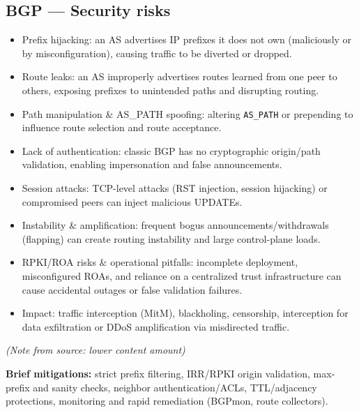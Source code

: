 \documentclass[12pt]{article}
\begin{document}
\subsection{BGP --- Security risks}
\begin{itemize}
  \item Prefix hijacking: an AS advertises IP prefixes it does not own (maliciously or by misconfiguration), causing traffic to be diverted or dropped.
  \item Route leaks: an AS improperly advertises routes learned from one peer to others, exposing prefixes to unintended paths and disrupting routing.
  \item Path manipulation \& AS\_PATH spoofing: altering \texttt{AS\_PATH} or prepending to influence route selection and route acceptance.
  \item Lack of authentication: classic BGP has no cryptographic origin/path validation, enabling impersonation and false announcements.
  \item Session attacks: TCP-level attacks (RST injection, session hijacking) or compromised peers can inject malicious UPDATEs.
  \item Instability \& amplification: frequent bogus announcements/withdrawals (flapping) can create routing instability and large control-plane loads.
  \item RPKI/ROA risks \& operational pitfalls: incomplete deployment, misconfigured ROAs, and reliance on a centralized trust infrastructure can cause accidental outages or false validation failures.
  \item Impact: traffic interception (MitM), blackholing, censorship, interception for data exfiltration or DDoS amplification via misdirected traffic.
\end{itemize}

\textit{(Note from source: lower content amount)}

\textbf{Brief mitigations:} strict prefix filtering, IRR/RPKI origin validation, max-prefix and sanity checks, neighbor authentication/ACLs, TTL/adjacency protections, monitoring and rapid remediation (BGPmon, route collectors).

\hrulefill
\end{document}
